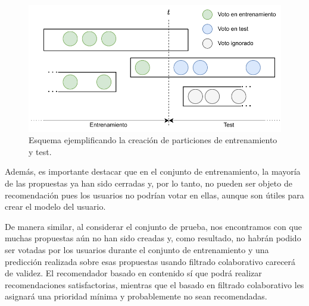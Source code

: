 \begin{figure}[b!]
    \centering
    \includegraphics{figures/04_validacion/rs-time-folds-evaluacion.drawio.pdf}
    \caption[Esquema de la división en particiones de train y test.]{Esquema ejemplificando la creación de particiones de entrenamiento y test.}
    \label{fig:example-train-test}
\end{figure}

Además, es importante destacar que en el conjunto de entrenamiento, la mayoría de las propuestas ya han sido cerradas y, por lo tanto, no pueden ser objeto de recomendación pues los usuarios no podrían votar en ellas, aunque son útiles para crear el modelo del usuario.

De manera similar, al considerar el conjunto de prueba, nos encontramos con que muchas propuestas aún no han sido creadas y, como resultado, no habrán podido ser votadas por los usuarios durante el conjunto de entrenamiento y una predicción realizada sobre esas propuestas usando filtrado colaborativo carecerá de validez.
El recomendador basado en contenido sí que podrá realizar recomendaciones satisfactorias, mientras que el basado en filtrado colaborativo les asignará una prioridad mínima y probablemente no sean recomendadas. %


